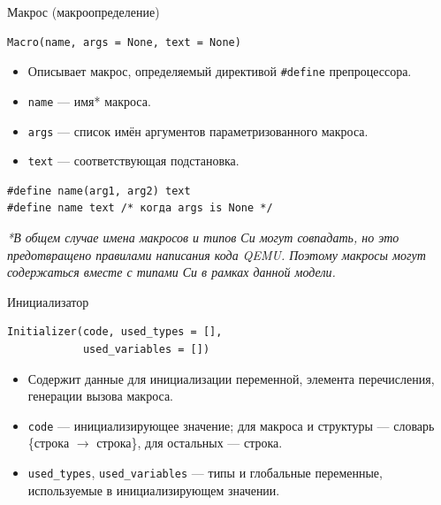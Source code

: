 \documentclass[unicode,hyperref={unicode=true}]{beamer}
\theoremstyle{definition}
\theoremstyle{plain}
\begin{document}
\begin{frame}[fragile]{Макрос (макроопределение)}
\lstset{language=Python}
\begin{lstlisting}
Macro(name, args = None, text = None)
\end{lstlisting}
\vfill
\begin{itemize}
\item Описывает макрос, определяемый директивой \texttt{\#define} препроцессора.
\item \texttt{name} --- имя* макроса.
\item \texttt{args} --- список имён аргументов параметризованного макроса.
\item \texttt{text} --- соответствующая подстановка.
\end{itemize}
\vfill

\lstset{language=C}
\begin{lstlisting}
#define name(arg1, arg2) text
#define name text /* когда args is None */
\end{lstlisting}

\vfill

\textit{*В общем случае имена макросов и типов Си могут совпадать, но это
предотвращено правилами написания кода QEMU. Поэтому макросы могут содержаться
вместе с типами Си в рамках данной модели.}
\end{frame}



\begin{frame}[fragile]{Инициализатор}
\lstset{language=Python}
\begin{lstlisting}
Initializer(code, used_types = [],
            used_variables = [])
\end{lstlisting}
\vfill
\begin{itemize}
\item Содержит данные для инициализации переменной, элемента перечисления,
    генерации вызова макроса.
\item \texttt{code} --- инициализирующее значение; для макроса и структуры
    --- словарь \{строка \(\rightarrow\) строка\}, для остальных --- строка.
\item \texttt{used\_types}, \texttt{used\_variables} --- типы и глобальные
    переменные, используемые в инициализирующем значении.
\end{itemize}
\end{frame}
\end{document}
